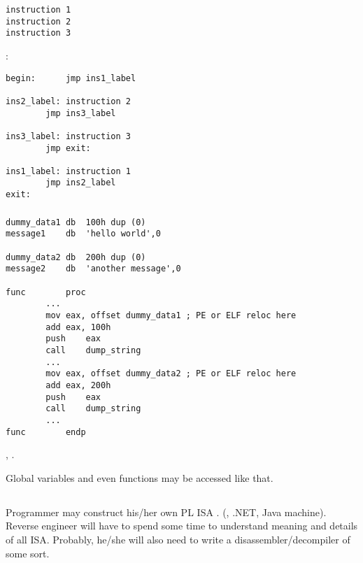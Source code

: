\begin{lstlisting}
instruction 1
instruction 2
instruction 3
\end{lstlisting}

:

\begin{lstlisting}
begin:		jmp	ins1_label

ins2_label:	instruction 2
		jmp	ins3_label

ins3_label:	instruction 3
		jmp	exit:

ins1_label:	instruction 1
		jmp	ins2_label
exit:
\end{lstlisting}

\subsubsection{}

\begin{lstlisting}
dummy_data1	db	100h dup (0)
message1	db	'hello world',0

dummy_data2	db	200h dup (0)
message2	db	'another message',0

func		proc
		...
		mov	eax, offset dummy_data1 ; PE or ELF reloc here
		add	eax, 100h
		push	eax
		call	dump_string
		...
		mov	eax, offset dummy_data2 ; PE or ELF reloc here
		add	eax, 200h
		push	eax
		call	dump_string
		...
func		endp
\end{lstlisting}

\IDA{}   \AndENRU {}, 
.

{Global variables and even functions may be accessed like that}.

\subsection{}

{Programmer may construct his/her own} \ac{PL} \OrENRU \ac{ISA} .
(, .NET, Java machine).
Reverse engineer
{will have to spend some time to understand meaning and details of all} \ac{ISA}.
{Probably, he/she will also need to write a disassembler/decompiler of some sort}.

